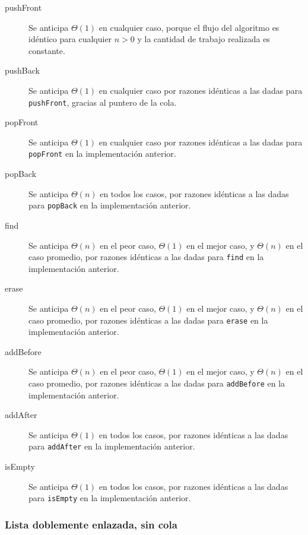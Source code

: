 \begin{description}
	\item[pushFront]{
		Se anticipa $\Theta{} (1)$ en cualquier caso, porque el flujo del algoritmo es idéntico para cualquier $n > 0$ y la cantidad de trabajo realizada es constante.
	}
	\item[pushBack]{
		Se anticipa $\Theta{} (1)$ en cualquier caso por razones idénticas a las dadas para \texttt{pushFront}, gracias al puntero de la cola.
	}
	\item[popFront]{
		Se anticipa $\Theta{} (1)$ en cualquier caso por razones idénticas a las dadas para \texttt{popFront} en la implementación anterior.
	}
	\item[popBack]{
		Se anticipa $\Theta{} (n)$ en todos los casos, por razones idénticas a las dadas para \texttt{popBack} en la implementación anterior.
	}
	\item[find]{
		Se anticipa $\Theta{} (n)$ en el peor caso, $\Theta{} (1)$ en el mejor caso, y $\Theta{} (n)$ en el caso promedio, por razones idénticas a las dadas para \texttt{find} en la implementación anterior.
	}
	\item[erase]{
		Se anticipa $\Theta{} (n)$ en el peor caso, $\Theta{} (1)$ en el mejor caso, y $\Theta{} (n)$ en el caso promedio, por razones idénticas a las dadas para \texttt{erase} en la implementación anterior.
	}
	\item[addBefore]{
		Se anticipa $\Theta{} (n)$ en el peor caso, $\Theta{} (1)$ en el mejor caso, y $\Theta{} (n)$ en el caso promedio, por razones idénticas a las dadas para \texttt{addBefore} en la implementación anterior.
	}
	\item[addAfter]{
		Se anticipa $\Theta{} (1)$ en todos los casos, por razones idénticas a las dadas para \texttt{addAfter} en la implementación anterior.
	}
	\item[isEmpty]{
		Se anticipa $\Theta{} (1)$ en todos los casos, por razones idénticas a las dadas para \texttt{isEmpty} en la implementación anterior.
	}
\end{description}

\subsubsection{Lista doblemente enlazada, sin cola}

